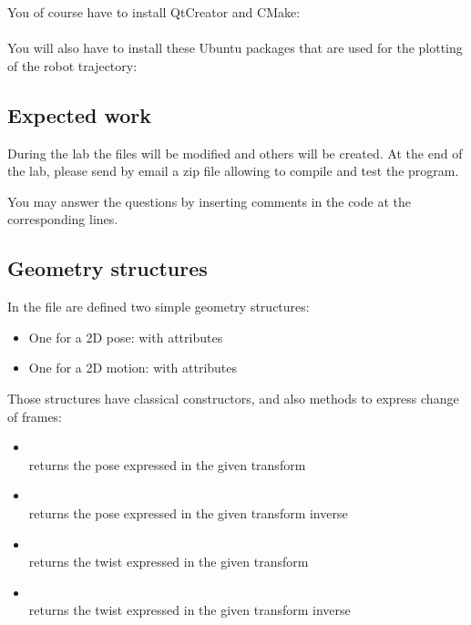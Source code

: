 \documentclass{ecnreport}
\begin{document}
You of course have to install QtCreator and CMake:\\
 \\

You will also have to install these Ubuntu packages that are used for the plotting of the robot trajectory:\\

\subsection{Expected work}

During the lab the files will be modified and others will be created.
At the end of the lab, please send by email a zip file allowing to compile and test the program.

You may answer the questions by inserting comments in the code at the corresponding lines.

\subsection{Geometry structures}

In the  file are defined two simple geometry structures:
\begin{itemize}
 \item One for a 2D pose:  with attributes 
 \item One for a 2D motion:  with attributes  
\end{itemize}Those structures have classical constructors, and also methods to express change of frames:
\begin{itemize}
 \item {} \\returns the pose  expressed in the given transform
 \item {}\\ returns the pose expressed in the given transform inverse
 \item {} \\returns the twist expressed in the given transform
 \item {}\\ returns the twist expressed in the given transform inverse
 \end{itemize}
\end{document}

